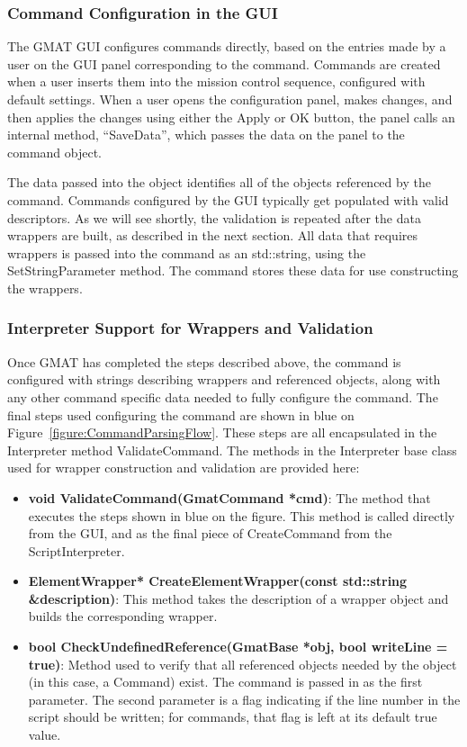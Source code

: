 \subsubsection{Command Configuration in the GUI}

The GMAT GUI configures commands directly, based on the entries made by a user on the GUI panel
corresponding to the command.  Commands are created when a user inserts them into the mission
control sequence, configured with default settings.  When a user opens the configuration panel,
makes changes, and then applies the changes using either the Apply or OK button, the panel calls an
internal method, ``SaveData'', which passes the data on the panel to the command object.

The data passed into the object identifies all of the objects referenced by the command.  Commands
configured by the GUI typically get populated with valid descriptors. As we will see shortly, the
 validation is repeated after the data wrappers are built, as described in the next section.  All
data that requires wrappers is passed into the command as an std::string, using the
SetStringParameter method. The command stores these data for use constructing the wrappers.

\subsubsection{Interpreter Support for Wrappers and Validation}

Once GMAT has completed the steps described above, the command is configured with strings
describing wrappers and referenced objects, along with any other command specific data needed to
fully configure the command.  The final steps used configuring the command are shown in blue on
Figure~\ref{figure:CommandParsingFlow}.  These steps are all encapsulated in the Interpreter method
ValidateCommand.  The methods in the Interpreter base class used for wrapper construction and
validation are provided here:

\begin{itemize}
\item \textbf{void ValidateCommand(GmatCommand *cmd)}:  The method that executes the steps shown in
blue on the figure.  This method is called directly from the GUI, and as the final piece of
CreateCommand from the ScriptInterpreter.
\item \textbf{ElementWrapper* CreateElementWrapper(const std::string \&description)}:  This method
takes the description of a wrapper object and builds the corresponding wrapper.
\item \textbf{bool CheckUndefinedReference(GmatBase *obj, bool writeLine = true)}:  Method used to
verify that all referenced objects needed by the object (in this case, a Command) exist.  The
command is passed in as the first parameter.  The second parameter is a flag indicating if the line
number in the script should be written; for commands, that flag is left at its default true value.
\end{itemize}

